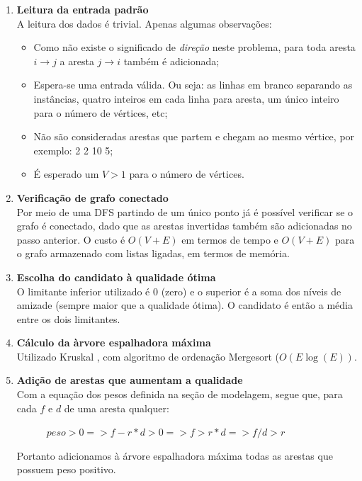 \documentclass[a4paper,12pt,titlepage]{article}
\begin{document}
\begin{enumerate}
\item\textbf{Leitura da entrada padrão} \\
A leitura dos dados é trivial. Apenas algumas observações: \begin{itemize} 
    \item Como não existe o significado de \textit{direção} neste problema, para toda aresta $i\rightarrow j$ a aresta $j\rightarrow i$ também é adicionada;
    \item Espera-se uma entrada válida. Ou seja: as linhas em branco separando as instâncias, quatro inteiros em cada linha para aresta, um único inteiro para o número de vértices, etc;
    \item Não são consideradas arestas que partem e chegam ao mesmo vértice, por exemplo: 2 2 10 5;
    \item É esperado um $V > 1$ para o número de vértices.
\end{itemize}

\item\textbf{Verificação de grafo conectado} \\
Por meio de uma DFS partindo de um único ponto já é possível verificar se o grafo é conectado, dado que as arestas invertidas também são adicionadas no passo anterior. O custo é $O(V + E)$ em termos de tempo e $O(V + E)$ para o grafo armazenado com listas ligadas, em termos de memória.

\item\textbf{Escolha do candidato à qualidade ótima} \\
O limitante inferior utilizado é 0 (zero) e o superior é a soma dos níveis de amizade (sempre maior que a qualidade ótima). O candidato é então a média entre os dois limitantes.

\item\textbf{Cálculo da àrvore espalhadora máxima} \\
Utilizado Kruskal \cite{cormen}, com algoritmo de ordenação Mergesort ($O(E\log(E))$.

\item\textbf{Adição de arestas que aumentam a qualidade} \\
Com a equação dos pesos definida na seção de modelagem, segue que, para cada $f$ e $d$ de uma aresta qualquer:

\ \ \ \ \ \ $ peso > 0  =>  f - r*d > 0  =>  f > r*d   =>  f/d > r $

Portanto adicionamos à árvore espalhadora máxima todas as arestas que possuem peso positivo.


\end{enumerate}
\end{document}
